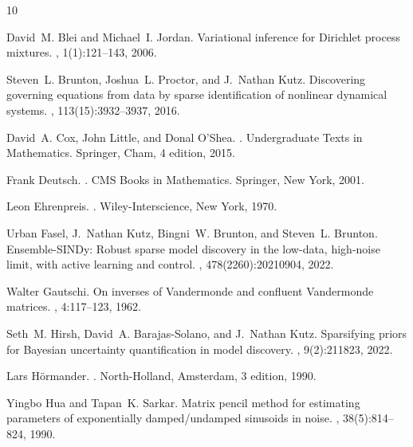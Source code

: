 \documentclass[11pt]{article}
\theoremstyle{plain}
\theoremstyle{definition}
\theoremstyle{remark}
\begin{document}


\begin{thebibliography}{10}

David~M. Blei and Michael~I. Jordan.
\newblock Variational inference for {D}irichlet process mixtures.
, 1(1):121--143, 2006.

Steven~L. Brunton, Joshua~L. Proctor, and J.~Nathan Kutz.
\newblock Discovering governing equations from data by sparse identification of
  nonlinear dynamical systems.
,
  113(15):3932--3937, 2016.

David~A. Cox, John Little, and Donal O'Shea.
.
\newblock Undergraduate Texts in Mathematics. Springer, Cham, 4 edition, 2015.

Frank Deutsch.
.
\newblock CMS Books in Mathematics. Springer, New York, 2001.

Leon Ehrenpreis.
.
\newblock Wiley-Interscience, New York, 1970.

Urban Fasel, J.~Nathan Kutz, Bingni~W. Brunton, and Steven~L. Brunton.
\newblock Ensemble-{SINDy}: Robust sparse model discovery in the low-data,
  high-noise limit, with active learning and control.
, 478(2260):20210904, 2022.

Walter Gautschi.
\newblock On inverses of {V}andermonde and confluent {V}andermonde matrices.
, 4:117--123, 1962.

Seth~M. Hirsh, David~A. Barajas-Solano, and J.~Nathan Kutz.
\newblock Sparsifying priors for {B}ayesian uncertainty quantification in model
  discovery.
, 9(2):211823, 2022.

Lars H{\"o}rmander.
.
\newblock North-Holland, Amsterdam, 3 edition, 1990.

Yingbo Hua and Tapan~K. Sarkar.
\newblock Matrix pencil method for estimating parameters of exponentially
  damped/undamped sinusoids in noise.
,
  38(5):814--824, 1990.


\end{thebibliography}
\end{document}
